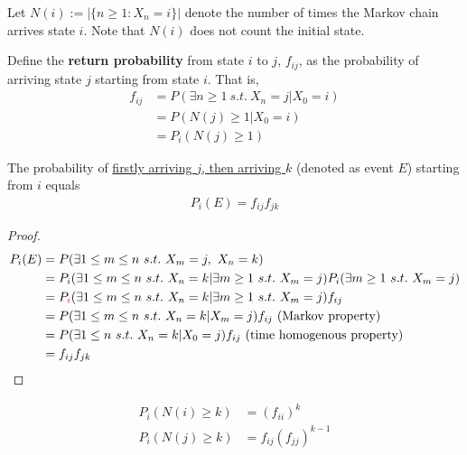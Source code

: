 \documentclass{article}
\begin{document}
    \begin{notation}
    	Let $N(i) := |\{n \geq 1: X_n = i\}|$ denote the number of times the Markov chain arrives state $i$. Note that $N(i)$ does not count the initial state.
    \end{notation}
    
    \begin{definition}
    	Define the \textbf{return probability} from state $i$ to $j$, $f_{ij}$, as the probability of arriving state $j$ starting from state $i$. That is,
    	\begin{align}
    		f_{ij} &= P(\exists n \geq 1\ s.t.\ X_n = j | X_0 = i) \\
    		&= P(N(j) \geq 1 | X_0 = i) \\
    		&= P_i(N(j) \geq 1)
    	\end{align}
    \end{definition}
    
    \begin{proposition}
    	The probability of \ul{firstly arriving $j$, then arriving $k$} (denoted as event $E$) starting from $i$ equals
    	\begin{align}
    		P_i(E) = f_{ij} f_{jk}
    	\end{align}
    \end{proposition}
    
    \begin{proof}
    	\begin{align}
    		P_i(E) &= P(\exists 1 \leq m \leq n \ s.t.\ X_m=j,\ X_n = k) \\
    		&= P_i(\exists 1 \leq m \leq n \ s.t.\ X_n = k|\exists m \geq 1\ s.t.\ X_m=j) P_i(\exists m \geq 1\ s.t.\ X_m=j) \\
    		&= P_{\textcolor{red}{i}}(\exists 1 \leq m \leq n \ s.t.\ X_n = k|\exists m \geq 1\ s.t.\ X_m=j) f_{ij} \\
    		&= P(\exists 1 \leq m \leq n \ s.t.\ X_n = k|X_m=j) f_{ij} \text{{ (Markov property)}} \\
    		&= P(\exists 1 \leq n \ s.t.\ X_n = k|X_0=j) f_{ij} \text{{ (time homogenous property)}} \\
    		&= f_{ij}f_{jk}
    	\end{align}
    \end{proof}
    
    \begin{corollary}
    	\begin{align}
    		P_i(N(i) \geq k) &= (f_{ii})^k \\
    		P_i(N(j) \geq k) &= f_{ij}(f_{jj})^{k-1}
    	\end{align}
    \end{corollary}
\end{document}
